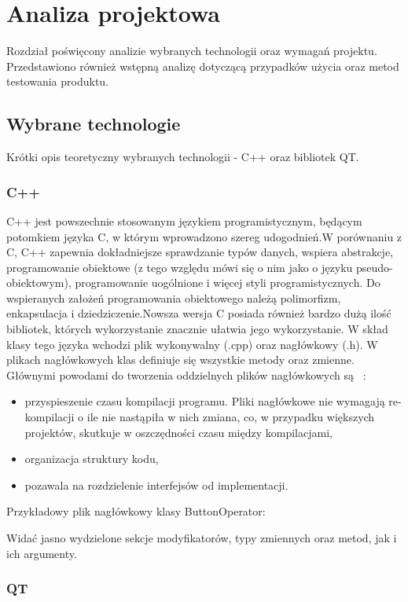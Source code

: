 \documentclass[twoside,a4paper]{book}
\begin{document}
\chapter{Analiza projektowa}
Rozdział poświęcony analizie wybranych technologii oraz wymagań projektu. Przedstawiono również wstępną analizę dotyczącą przypadków użycia oraz metod testowania produktu.
\section{Wybrane technologie}
Krótki opis teoretyczny wybranych technologii - C++ oraz bibliotek QT. 
\subsection{C++}

C++ jest powszechnie stosowanym językiem programistycznym, będącym potomkiem języka C, w którym wprowadzono szereg udogodnień.W porównaniu z C, C++ zapewnia dokładniejsze sprawdzanie typów danych, wspiera abstrakcje, programowanie obiektowe (z tego względu mówi się o nim jako o języku pseudo-obiektowym), programowanie uogólnione i więcej styli programistycznych. Do wspieranych założeń programowania obiektowego należą polimorfizm, enkapsulacja i dziedziczenie.Nowsza wersja C posiada również bardzo dużą ilość bibliotek, których wykorzystanie znacznie ułatwia jego wykorzystanie.
W skład klasy tego języka wchodzi plik wykonywalny (.cpp) oraz nagłówkowy (.h). W plikach nagłówkowych klas definiuje się wszystkie metody oraz zmienne. Głównymi powodami do tworzenia oddzielnych plików nagłówkowych są ~\cite{cppH}:
\begin{itemize}
\item przyspieszenie czasu kompilacji programu. Pliki nagłówkowe nie wymagają re-kompilacji o ile nie nastąpiła w nich zmiana, co, w przypadku większych projektów, skutkuje w oszczędności czasu między kompilacjami,
\item organizacja struktury kodu, 
\item pozawala na rozdzielenie interfejsów od implementacji.
\end{itemize}
Przykładowy plik nagłówkowy klasy ButtonOperator:

Widać jasno wydzielone sekcje modyfikatorów, typy zmiennych oraz metod, jak i ich argumenty. 
\subsection{QT}
\end{document}
